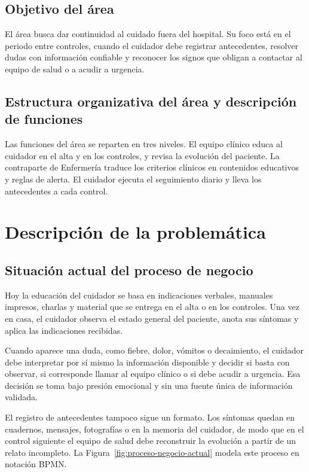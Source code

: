 \subsection*{Objetivo del área}

El área busca dar continuidad al cuidado fuera del hospital. Su foco está en el
periodo entre controles, cuando el cuidador debe registrar antecedentes, resolver
dudas con información confiable y reconocer los signos que obligan a contactar
al equipo de salud o a acudir a urgencia.

\subsection*{Estructura organizativa del área y descripción de funciones}

Las funciones del área se reparten en tres niveles. El equipo clínico educa al
cuidador en el alta y en los controles, y revisa la evolución del paciente. La
contraparte de Enfermería traduce los criterios clínicos en contenidos educativos
y reglas de alerta. El cuidador ejecuta el seguimiento diario y lleva los
antecedentes a cada control.

\section[Descripción de la Problemática]{Descripción de la problemática}

\subsection{Situación actual del proceso de negocio}

Hoy la educación del cuidador se basa en indicaciones verbales, manuales
impresos, charlas y material que se entrega en el alta o en los controles. Una
vez en casa, el cuidador observa el estado general del paciente, anota sus
síntomas y aplica las indicaciones recibidas.

Cuando aparece una duda, como fiebre, dolor, vómitos o decaimiento, el cuidador
debe interpretar por sí mismo la información disponible y decidir si basta con
observar, si corresponde llamar al equipo clínico o si debe acudir a urgencia.
Esa decisión se toma bajo presión emocional y sin una fuente única de información
validada.

El registro de antecedentes tampoco sigue un formato. Los síntomas quedan en
cuadernos, mensajes, fotografías o en la memoria del cuidador, de modo que en el
control siguiente el equipo de salud debe reconstruir la evolución a partir de un
relato incompleto. La Figura~\ref{fig:proceso-negocio-actual} modela este
proceso en notación BPMN.

